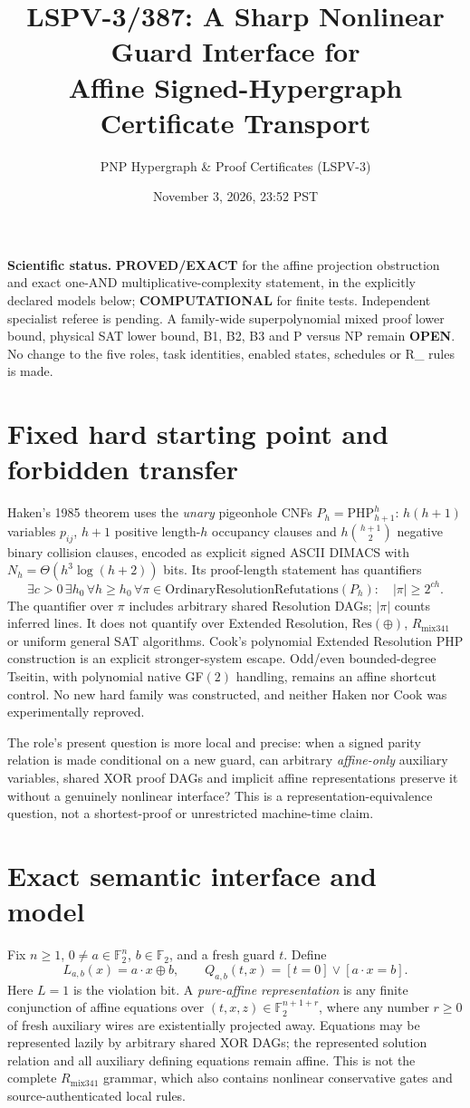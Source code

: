 \documentclass[11pt]{article}
\title{LSPV-3/387: A Sharp Nonlinear Guard Interface for\\Affine Signed-Hypergraph Certificate Transport}
\author{PNP Hypergraph \& Proof Certificates (LSPV-3)}
\date{November 3, 2026, 23:52 PST}
\newcommand{\Rmix}{R_{\mathrm{mix341}}}
\begin{document}
\maketitle
\noindent\textbf{Scientific status.} \textbf{PROVED/EXACT} for the affine projection obstruction and exact one-AND multiplicative-complexity statement, in the explicitly declared models below; \textbf{COMPUTATIONAL} for finite tests. Independent specialist referee is pending. A family-wide superpolynomial mixed proof lower bound, physical SAT lower bound, B1, B2, B3 and P versus NP remain \textbf{OPEN}. No change to the five roles, task identities, enabled states, schedules or \Rmix{} rules is made.

\section*{Fixed hard starting point and forbidden transfer}
Haken's 1985 theorem uses the \emph{unary} pigeonhole CNFs $P_h=\mathrm{PHP}_{h+1}^{h}$: $h(h+1)$ variables $p_{ij}$, $h+1$ positive length-$h$ occupancy clauses and $h\binom{h+1}{2}$ negative binary collision clauses, encoded as explicit signed ASCII DIMACS with $N_h=\Theta(h^3\log(h+2))$ bits. Its proof-length statement has quantifiers
\[
 \exists c>0\,\exists h_0\,\forall h\ge h_0\,
 \forall\pi\in\mathrm{OrdinaryResolutionRefutations}(P_h):
 \quad |\pi|\ge 2^{ch}.
\]
The quantifier over $\pi$ includes arbitrary shared Resolution DAGs; $|\pi|$ counts inferred lines. It does not quantify over Extended Resolution, $\mathrm{Res}(\oplus)$, $\Rmix$ or uniform general SAT algorithms. Cook's polynomial Extended Resolution PHP construction is an explicit stronger-system escape. Odd/even bounded-degree Tseitin, with polynomial native GF$(2)$ handling, remains an affine shortcut control. No new hard family was constructed, and neither Haken nor Cook was experimentally reproved.

The role's present question is more local and precise: when a signed parity relation is made conditional on a new guard, can arbitrary \emph{affine-only} auxiliary variables, shared XOR proof DAGs and implicit affine representations preserve it without a genuinely nonlinear interface? This is a representation-equivalence question, not a shortest-proof or unrestricted machine-time claim.

\section*{Exact semantic interface and model}
Fix $n\ge1$, $0\ne a\in\mathbb F_2^n$, $b\in\mathbb F_2$, and a fresh guard $t$. Define
\[
 L_{a,b}(x) = a\cdot x\oplus b,\qquad
 Q_{a,b}(t,x)=[t=0]\lor[a\cdot x=b].
\]
Here $L=1$ is the violation bit. A \emph{pure-affine representation} is any finite conjunction of affine equations over $(t,x,z)\in\mathbb F_2^{n+1+r}$, where any number $r\ge0$ of fresh auxiliary wires are existentially projected away. Equations may be represented lazily by arbitrary shared XOR DAGs; the represented solution relation and all auxiliary defining equations remain affine. This is not the complete $\Rmix$ grammar, which also contains nonlinear conservative gates and source-authenticated local rules.
\end{document}
